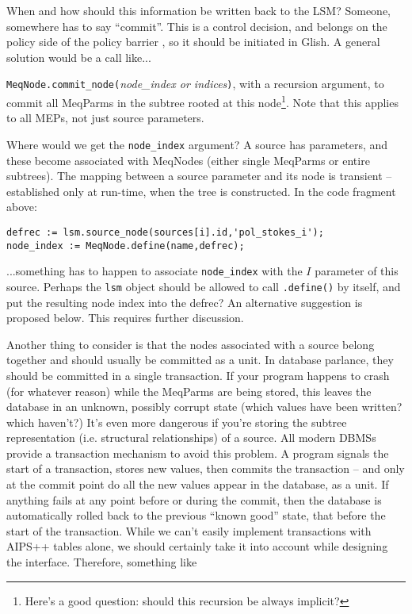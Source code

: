 \documentclass[10pt]{article}
\begin{document}
When and how should this information be written back to the LSM? Someone,
somewhere has to say ``commit''. This is a control decision, and belongs on the
policy side of the policy barrier \cite{PSS4}, so it should be initiated in
Glish. A general solution would be a call like...

{\tt MeqNode.commit\_node(}{\em node\_index or indices}{\tt)}, with a recursion 
argument, to commit all MeqParms in the subtree rooted at this
node\footnote{Here's a good question: should this recursion be always
implicit?}. Note that this applies to all MEPs, not just source parameters.

Where would we get the {\tt node\_index} argument? A source has parameters, and
these become associated with MeqNodes (either single MeqParms or entire
subtrees). The mapping between a source parameter and its node is transient --
established only at run-time, when the tree is constructed. In the code
fragment above:

\begin{verbatim}
defrec := lsm.source_node(sources[i].id,'pol_stokes_i');
node_index := MeqNode.define(name,defrec);
\end{verbatim}

...something has to happen to associate {\tt node\_index} with the $I$
parameter of this source. Perhaps the {\tt lsm} object should be allowed to call
{\tt .define()} by itself, and put the resulting node index into the defrec?
An alternative suggestion is proposed below. This requires further discussion.

Another thing to consider is that the nodes associated with a source belong
together and should usually be committed as a unit. In database parlance, they
should be committed in a single transaction. If your program happens to crash
(for whatever reason) while the MeqParms are being stored, this leaves the
database in an unknown, possibly corrupt state (which values have been written?
which haven't?) It's even more dangerous if you're storing the subtree
representation (i.e. structural relationships) of a source. All modern DBMSs
provide a transaction mechanism to avoid this problem. A program signals the
start of a transaction, stores new values, then commits the transaction -- and
only at the commit point do all the new values appear in the database, as a
unit. If anything fails at any point before or during the commit, then the
database is automatically rolled back to the previous ``known good'' state,
that before the start of the transaction. While we can't easily implement
transactions with AIPS++ tables alone, we should certainly take it into account
while designing the interface. Therefore, something like
\end{document}
